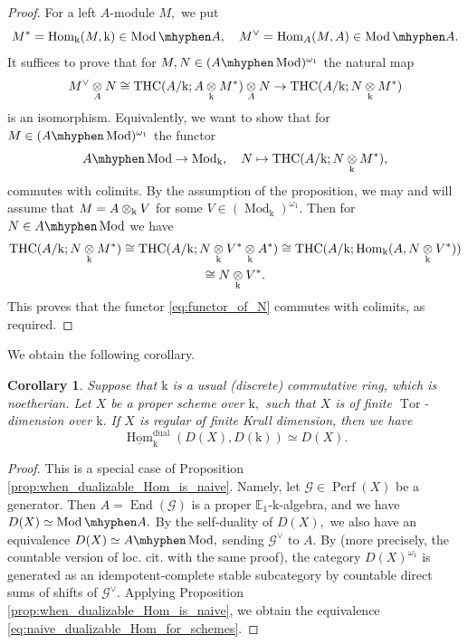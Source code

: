 \documentclass[11pt,leqno]{amsart}
\newtheorem{cor}[theo]{Corollary}
\numberwithin{equation}{section}
\def\Hom{\operatorname{Hom}}
\def\End{\operatorname{End}}
\newcommand{\tens}[1]{%
  \mathbin{\mathop{\otimes}\displaylimits_{#1}}%
}
\newcommand{\hy}{\mhyphen}
\newcommand{\dual}{\operatorname{dual}}
\newcommand{\bE}{{\mathbb E}}
\newcommand{\mk}{\mathrm k}
\newcommand{\cG}{{\mathcal G}}
\newcommand{\un}{\underline}
\newcommand{\THC}{\operatorname{THC}}
\newcommand{\Perf}{\operatorname{Perf}}
\newcommand{\Tor}{\operatorname{Tor}}
\newcommand{\Mod}{\operatorname{Mod}}
\begin{document}
\begin{proof}
For a left $A$-module $M,$ we put
\begin{equation*}
M^*=\Hom_{\mk}(M,\mk)\in\Mod\hy A,\quad M^{\vee}=\Hom_A(M,A)\in\Mod\hy A.
\end{equation*}
 It suffices to prove that for $M,N\in (A\hy\Mod)^{\omega_1}$ the natural map
 \begin{equation*}
 M^{\vee}\tens{A}N\cong \THC(A/\mk;A\tens{\mk}M^*)\tens{A}N\to \THC(A/\mk;N\tens{\mk}M^*)
 \end{equation*}
 is an isomorphism. Equivalently, we want to show that for $M\in (A\hy\Mod)^{\omega_1}$ the functor
\begin{equation}\label{eq:functor_of_N}
A\hy\Mod\to \Mod_{\mk},\quad N\mapsto \THC(A/\mk;N\tens{\mk}M^*),
\end{equation}
commutes with colimits. By the assumption of the proposition, we may and will assume that $M=A\tens{\mk}V$ for some $V\in(\Mod_{\mk})^{\omega_1}.$ Then for $N\in A\hy\Mod$ we have
\begin{multline*}
\THC(A/\mk;N\tens{\mk}M^*)\cong \THC(A/\mk;N\tens{\mk}V^*\tens{\mk}A^*)\cong \THC(A/\mk;\Hom_{\mk}(A,N\tens{\mk}V^*))\\
\cong N\tens{\mk}V^*.
\end{multline*}
This proves that the functor \eqref{eq:functor_of_N} commutes with colimits, as required.
\end{proof}

We obtain the following corollary.

\begin{cor}\label{cor:naive_dualizable_Hom_for_schemes}
Suppose that $\mk$ is a usual (discrete) commutative ring, which is noetherian. Let $X$ be a proper scheme over $\mk,$ such that $X$ is of finite $\Tor$-dimension over $\mk.$ If $X$ is regular of finite Krull dimension, then we have
\begin{equation}\label{eq:naive_dualizable_Hom_for_schemes}
\un{\Hom}_{\mk}^{\dual}(D(X),D(\mk))\simeq D(X).
\end{equation}
\end{cor}

\begin{proof}
This is a special case of Proposition \ref{prop:when_dualizable_Hom_is_naive}. Namely, let $\cG\in\Perf(X)$ be a generator. Then $A=\End(\cG)$ is a proper $\bE_1$-$\mk$-algebra, and we have $D(X)\simeq \Mod\hy A.$ By the self-duality of $D(X),$ we also have an equivalence $D(X)\simeq A\hy\Mod,$ sending $\cG^{\vee}$ to $A.$ By \cite[Theorem 2.1]{Nee21} (more precisely, the countable version of loc. cit. with the same proof), the category $D(X)^{\omega_1}$ is generated as an idempotent-complete stable subcategory by countable direct sums of shifts of $\cG^{\vee}.$ Applying Proposition \ref{prop:when_dualizable_Hom_is_naive}, we obtain the equivalence \eqref{eq:naive_dualizable_Hom_for_schemes}. 
\end{proof}
\end{document}
